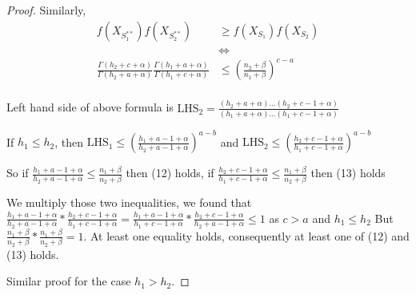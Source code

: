 \documentclass[aoas,preprint]{imsart}
\begin{document}
\begin{proof}
Similarly,
\begin{align*}
f(X_{S_1^{**}}) f(X_{S_2^{**}}) &\geq f(X_{S_1}) f(X_{S_2})\\
&\iff\\
\frac{\Gamma(h_2 + c + \alpha)}{\Gamma(h_2 + a + \alpha)} \frac{\Gamma(h_1 + a + \alpha)}{\Gamma(h_1 + c + \alpha)} &\leq (\frac{n_2 + \beta}{n_1 + \beta})^{c - a} \\
\end{align*}

 Left hand side of above formula is $\text{LHS}_2 = \frac{(h_2 + a + \alpha)...(h_2 + c - 1 + \alpha)}{(h_1 + a + \alpha) ... (h_1 + c - 1 + \alpha)}$

If $h_1 \leq h_2$, then $\text{LHS}_1 \leq (\frac{h_1 + a - 1 + \alpha}{h_2 + a  - 1 + \alpha})^{a - b}$ and $\text{LHS}_2 \leq (\frac{h_2 + c - 1 + \alpha}{h_1 + c  - 1 + \alpha})^{a - b}$

So if $\frac{h_1 + a - 1 + \alpha}{h_2 + a  - 1 + \alpha} \leq \frac{n_1 + \beta}{n_2 + \beta} $ then (12) holds, if $\frac{h_2 + c - 1 + \alpha}{h_1 + c  - 1 + \alpha} \leq \frac{n_1 + \beta}{n_2 + \beta}$ then (13) holds

We multiply those two inequalities, we found that $\frac{h_1 + a - 1 + \alpha}{h_2 + a  - 1 + \alpha} * \frac{h_2 + c - 1 + \alpha}{h_1 + c  - 1 + \alpha} = \frac{h_1 + a - 1 + \alpha}{h_1 + c  - 1 + \alpha} * \frac{h_2 + c - 1 + \alpha}{h_2 + a  - 1 + \alpha} \leq 1$ as $c > a$ and $h_1 \leq h_2$ But $\frac{n_1 + \beta}{n_2 + \beta} * \frac{n_1 + \beta}{n_2 + \beta} = 1$. At least one equality holds, consequently at least one of (12) and (13) holds.

Similar proof for the case $h_1 > h_2$.




\end{proof}
\end{document}
